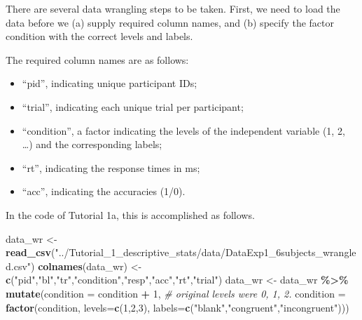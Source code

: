 \documentclass[
  man, donotrepeattitle,floatsintext]{apa6}
\newenvironment{Shaded}{\begin{snugshade}}{\end{snugshade}}
\newcommand{\AttributeTok}[1]{\textcolor[rgb]{0.13,0.29,0.53}{#1}}
\newcommand{\CommentTok}[1]{\textcolor[rgb]{0.56,0.35,0.01}{\textit{#1}}}
\newcommand{\DecValTok}[1]{\textcolor[rgb]{0.00,0.00,0.81}{#1}}
\newcommand{\FunctionTok}[1]{\textcolor[rgb]{0.13,0.29,0.53}{\textbf{#1}}}
\newcommand{\NormalTok}[1]{#1}
\newcommand{\OtherTok}[1]{\textcolor[rgb]{0.56,0.35,0.01}{#1}}
\newcommand{\SpecialCharTok}[1]{\textcolor[rgb]{0.81,0.36,0.00}{\textbf{#1}}}
\newcommand{\StringTok}[1]{\textcolor[rgb]{0.31,0.60,0.02}{#1}}
\providecommand{\tightlist}{%
  \setlength{\itemsep}{0pt}\setlength{\parskip}{0pt}}
\begin{document}
There are several data wrangling steps to be taken. First, we need to load the data before we (a) supply required column names, and (b) specify the factor condition with the correct levels and labels.

The required column names are as follows:

\begin{itemize}
\tightlist
\item
  ``pid'', indicating unique participant IDs;
\item
  ``trial'', indicating each unique trial per participant;
\item
  ``condition'', a factor indicating the levels of the independent variable (1, 2, \ldots) and the corresponding labels;
\item
  ``rt'', indicating the response times in ms;
\item
  ``acc'', indicating the accuracies (1/0).
\end{itemize}

In the code of Tutorial 1a, this is accomplished as follows.

\scriptsize

\begin{Shaded}
\begin{Highlighting}[]
\NormalTok{data\_wr }\OtherTok{\textless{}{-}} \FunctionTok{read\_csv}\NormalTok{(}\StringTok{"../Tutorial\_1\_descriptive\_stats/data/DataExp1\_6subjects\_wrangled.csv"}\NormalTok{)}
\FunctionTok{colnames}\NormalTok{(data\_wr) }\OtherTok{\textless{}{-}} \FunctionTok{c}\NormalTok{(}\StringTok{"pid"}\NormalTok{,}\StringTok{"bl"}\NormalTok{,}\StringTok{"tr"}\NormalTok{,}\StringTok{"condition"}\NormalTok{,}\StringTok{"resp"}\NormalTok{,}\StringTok{"acc"}\NormalTok{,}\StringTok{"rt"}\NormalTok{,}\StringTok{"trial"}\NormalTok{) }
\NormalTok{data\_wr }\OtherTok{\textless{}{-}}\NormalTok{ data\_wr }\SpecialCharTok{\%\textgreater{}\%} 
  \FunctionTok{mutate}\NormalTok{(}\AttributeTok{condition =}\NormalTok{ condition }\SpecialCharTok{+} \DecValTok{1}\NormalTok{, }\CommentTok{\# original levels were 0, 1, 2.}
         \AttributeTok{condition =} \FunctionTok{factor}\NormalTok{(condition, }\AttributeTok{levels=}\FunctionTok{c}\NormalTok{(}\DecValTok{1}\NormalTok{,}\DecValTok{2}\NormalTok{,}\DecValTok{3}\NormalTok{), }\AttributeTok{labels=}\FunctionTok{c}\NormalTok{(}\StringTok{"blank"}\NormalTok{,}\StringTok{"congruent"}\NormalTok{,}\StringTok{"incongruent"}\NormalTok{)))}
\end{Highlighting}
\end{Shaded}
\end{document}
